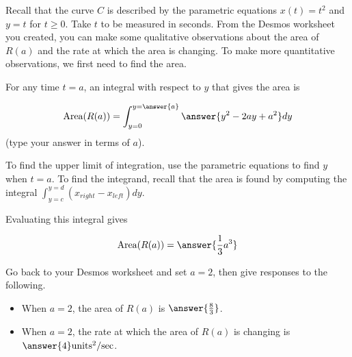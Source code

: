 \documentclass{ximera}
\author{Jim Talamo}
\begin{document}
\begin{exercise}
Recall that the curve $C$ is described by the parametric equations $x(t)=t^2$ and $y=t$ for $t \geq 0$.  Take $t$ to be measured in seconds.  From the Desmos worksheet you created, you can make some qualitative observations about the area of $R(a)$ and the rate at which the area is changing.  To make more quantitative observations, we first need to find the area.

For any time $t=a$, an integral with respect to $y$ that gives the area is

\[
\textrm{Area}(R(a)) = \int_{y= 0}^{y = \answer{a}} \answer{y^2-2ay+a^2} dy
\]
(type your answer in terms of $a$).

\begin{hint}
To find the upper limit of integration, use the parametric equations to find $y$ when $t=a$.  To find the integrand, recall that the area is found by computing the integral $\int_{y=c}^{y=d} \left(x_{right}-x_{left} \right) dy$.
\end{hint}

Evaluating this integral gives

\[
\textrm{Area}(R(a)) = \answer{\frac{1}{3}a^3}
\]

\begin{exercise}
Go back to your Desmos worksheet and set $a=2$, then give responses to the following.

\begin{itemize}
\item When $a=2$, the area of $R(a)$ is $\answer{\frac{8}{3}}$.
\item When $a=2$, the rate at which the area of $R(a)$ is changing is $\answer{4} \mathrm{units^2/sec}$.
\end{itemize}

\end{exercise}

\end{exercise}
\end{document}
